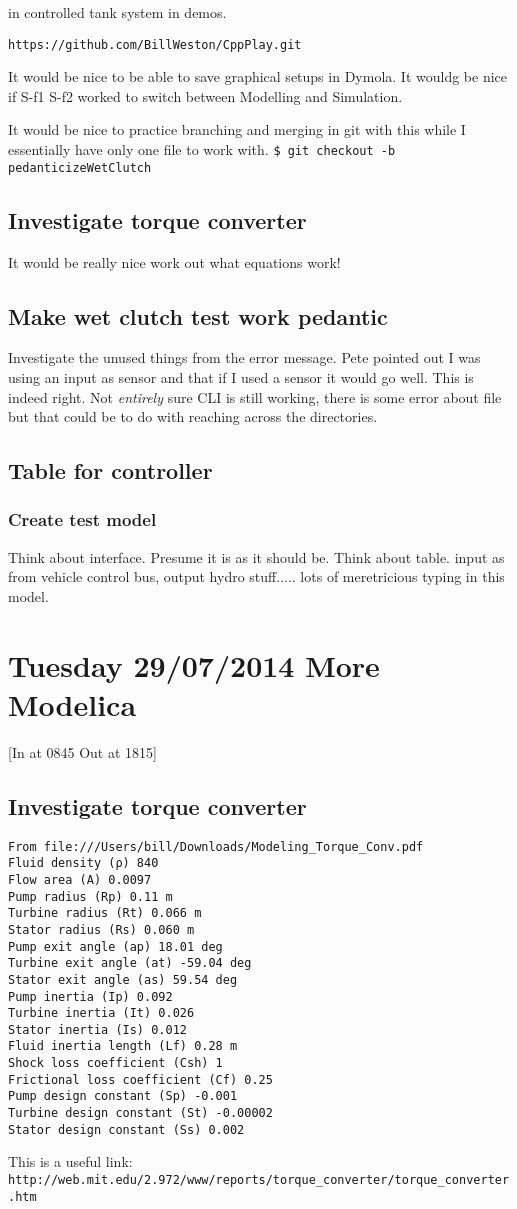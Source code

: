 \documentclass[11pt, oneside]{article}   	%
\begin{document}
in controlled tank system in demos.

\verb+https://github.com/BillWeston/CppPlay.git+

It would be nice to be able to save graphical setups in Dymola.
It wouldg be nice if S-f1 S-f2 worked to switch between Modelling and Simulation.

It would be nice to practice branching and merging in git with this
while I essentially have only one file to work with.
\verb+$ git checkout -b pedanticizeWetClutch+

\subsection{Investigate torque converter}
It would be really nice work out what equations work!
\subsection{Make wet clutch test work pedantic}
Investigate the unused things from the error message.
Pete pointed out I was using an input as sensor and that if I used a
sensor it would go well.   This is indeed right.   Not {\em entirely}
sure CLI is still working, there is some error about file but that
could be to do with reaching across the directories.
\subsection{Table for controller}
\subsubsection{Create test model}
Think about interface.  Presume it is as it should be.  Think about table.  
input as from vehicle control bus, output hydro stuff..... lots of
meretricious typing in this model.

\section{Tuesday 29/07/2014  More Modelica}
[In at 0845 Out at 1815]
\subsection{Investigate torque converter}
\begin{verbatim}
From file:///Users/bill/Downloads/Modeling_Torque_Conv.pdf
Fluid density (ρ) 840 
Flow area (A) 0.0097 
Pump radius (Rp) 0.11 m 
Turbine radius (Rt) 0.066 m 
Stator radius (Rs) 0.060 m
Pump exit angle (ap) 18.01 deg
Turbine exit angle (at) -59.04 deg
Stator exit angle (as) 59.54 deg
Pump inertia (Ip) 0.092 
Turbine inertia (It) 0.026 
Stator inertia (Is) 0.012 
Fluid inertia length (Lf) 0.28 m
Shock loss coefficient (Csh) 1
Frictional loss coefficient (Cf) 0.25
Pump design constant (Sp) -0.001 
Turbine design constant (St) -0.00002 
Stator design constant (Ss) 0.002
\end{verbatim}
This is a useful link:\\
\verb+http://web.mit.edu/2.972/www/reports/torque_converter/torque_converter.htm+
\end{document}
